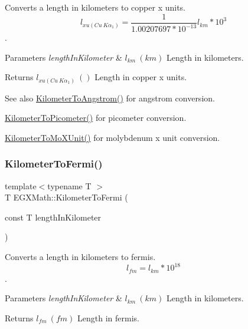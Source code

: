 Converts a length in kilometers to copper x units. \[ l_{xu(Cu\ K\alpha_1)}= \frac{1}{1.00207697*10^{-13}} l_{km} * 10^{3}\]. 


\begin{DoxyParams}{Parameters}
{\em length\+In\+Kilometer} & $ l_{km}\ (km)$ Length in kilometers. \\
\hline
\end{DoxyParams}
\begin{DoxyReturn}{Returns}
$ l_{xu(Cu\ K\alpha_1)}\ ()$ Length in copper x units. 
\end{DoxyReturn}
\begin{DoxySeeAlso}{See also}
\mbox{\hyperlink{group___e_g_x_math-_conversions-_length_conversions-_kilometer-_non-_s_i_ga415a412a1b03916d6071a206a3318035}{Kilometer\+To\+Angstrom()}} for angstrom conversion. 

\mbox{\hyperlink{group___e_g_x_math-_conversions-_length_conversions-_kilometer-_s_i_ga73f6e033de3c41892f06cde1862f68d6}{Kilometer\+To\+Picometer()}} for picometer conversion. 

\mbox{\hyperlink{group___e_g_x_math-_conversions-_length_conversions-_kilometer-_non-_s_i_ga547782594ebd0cc3e565f6d32f9528df}{Kilometer\+To\+Mo\+X\+Unit()}} for molybdenum x unit conversion. 
\end{DoxySeeAlso}
\mbox{\label{group___e_g_x_math-_conversions-_length_conversions-_kilometer-_non-_s_i_ga9c38d019deb86a60173d5d2b65a1ef57}} 
\subsubsection{\texorpdfstring{Kilometer\+To\+Fermi()}{KilometerToFermi()}}
{\footnotesize\ttfamily template$<$typename T $>$ \\
T E\+G\+X\+Math\+::\+Kilometer\+To\+Fermi (\begin{DoxyParamCaption}\item[{const T}]{length\+In\+Kilometer }\end{DoxyParamCaption})}



Converts a length in kilometers to fermis. \[ l_{fm}=l_{km} * 10^{18} \]. 


\begin{DoxyParams}{Parameters}
{\em length\+In\+Kilometer} & $ l_{km}\ (km)$ Length in kilometers. \\
\hline
\end{DoxyParams}
\begin{DoxyReturn}{Returns}
$ l_{fm}\ (fm)$ Length in fermis. 
\end{DoxyReturn}
\mbox{\label{group___e_g_x_math-_conversions-_length_conversions-_kilometer-_non-_s_i_gae662bafe0d1fc36276a336fd969307a0}} 
